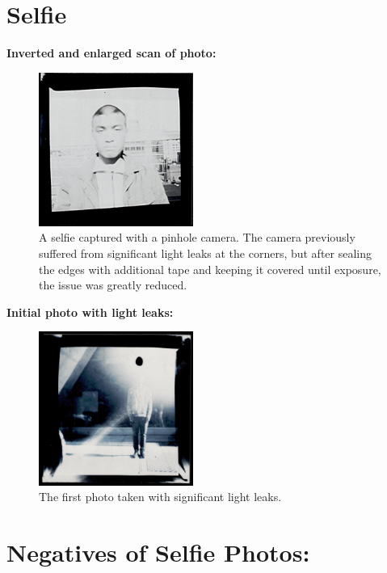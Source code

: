 \documentclass[12pt]{article}
\begin{document}
\section*{Selfie}
\textbf{Inverted and enlarged scan of photo:}
\begin{figure}[H]
  \centering
  \includegraphics[width=0.45\textwidth]{selfie inv.PNG}
  \caption{A selfie captured with a pinhole camera. The camera previously suffered from significant light leaks at the corners, but after sealing the edges with additional tape and keeping it covered until exposure, the issue was greatly reduced.}
\end{figure}
\textbf{Initial photo with light leaks:}
\begin{figure}[H]
  \centering
  \includegraphics[width=0.45\textwidth]{bad selfie.PNG}
  \caption{The first photo taken with significant light leaks.}
\end{figure}
\newpage
\section*{Negatives of Selfie Photos:}
\newpage
\end{document}
